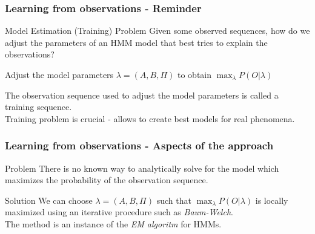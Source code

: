 \begin{frame}[t]
	\frametitle{Learning from observations - Reminder}
	\begin{block}{Model Estimation (Training) Problem}
    	Given some observed sequences, how do we adjust the \alert{parameters} of an HMM model that best tries 	
    	to explain the observations?
  	\end{block}
  	\pause
  	
  	\begin{block}{}
  		Adjust the model parameters $\lambda = (A, B, \Pi)$ to obtain $\max_{\lambda} P(O \vert \lambda)$
  	\end{block}
  	\pause
  	
  	\begin{block}{}
  		The observation sequence used to adjust the model parameters is called a \alert{training} sequence.\\
  		Training problem is crucial - allows to create best models for real phenomena.
  	\end{block}
\end{frame}


\begin{frame}[t]
	\frametitle{Learning from observations - Aspects of the approach}
	\pause
		
	\begin{block}{\alert{Problem}}
    	There is no known way to analytically solve for the model which maximizes the probability of the
    	observation sequence.
  	\end{block}
  	\pause
  	
  	\begin{block}{Solution}
  		We can choose $\lambda = (A, B, \Pi)$ such that $\max_{\lambda} P(O \vert \lambda)$ is 
  		\alert{locally maximized} using an \alert{iterative procedure} such as \emph{Baum-Welch}.\\
  		The method is an instance of the \emph{EM algoritm} \citep{dempster1977maximum} for HMMs.
  	\end{block}
  	
\end{frame}


